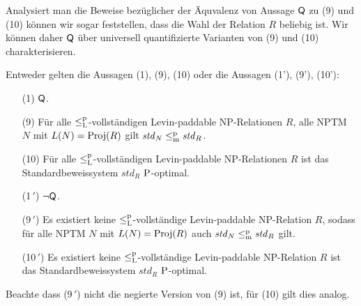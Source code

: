 Analysiert man die Beweise bezüglicher der Äquvalenz von Aussage $\hQ$ zu (9) und (10) können wir sogar feststellen, dass die Wahl der Relation $R$ beliebig ist. 
Wir können daher $\hQ$ über universell quantifizierte Varianten von (9) und (10) charakterisieren. 
\begin{theorem}
    Entweder gelten die Aussagen (1), (9), (10) oder die Aussagen (1'), (9'),  (10'):
    \begin{enumerate}
        \item[(1)] $\hQ$.
        \item[(9)] Für alle $\leqlp$-vollständigen Levin-paddable NP-Relationen $R$, alle NPTM $N$ mit $L(N)=\Proj(R)$ gilt $\mathit{std}_N\leqmp\mathit{std}_R$.
        \item[(10)] Für alle $\leqlp$-vollständigen Levin-paddable NP-Relationen $R$ ist das Standardbeweissystem $\mathit{std}_R$ $\P$-optimal.
        \item[(1$\,'$)] $\neg\hQ$.
        \item[(9$\,'$)] Es existiert keine $\leqlp$-vollständige Levin-paddable NP-Relation $R$, sodass für alle NPTM $N$ mit $L(N)=\Proj(R)$ auch $\mathit{std}_N\leqmp \mathit{std}_R$ gilt.
        \item[(10$\,'$)] Es existiert keine $\leqlp$-vollständige Levin-paddable NP-Relation $R$ ist das Standardbeweissystem $\mathit{std}_R$ $\P$-optimal.
    \end{enumerate}
    Beachte dass (9$\,'$) nicht die negierte Version von (9) ist, für (10) gilt dies analog.
\end{theorem}

